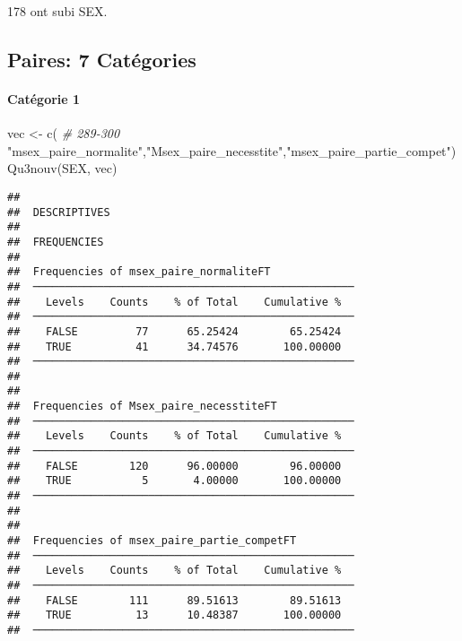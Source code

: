 \documentclass[
]{article}
\newenvironment{Shaded}{\begin{snugshade}}{\end{snugshade}}
\newcommand{\CommentTok}[1]{\textcolor[rgb]{0.56,0.35,0.01}{\textit{#1}}}
\newcommand{\DecValTok}[1]{\textcolor[rgb]{0.00,0.00,0.81}{#1}}
\newcommand{\FunctionTok}[1]{\textcolor[rgb]{0.00,0.00,0.00}{#1}}
\newcommand{\NormalTok}[1]{#1}
\newcommand{\OtherTok}[1]{\textcolor[rgb]{0.56,0.35,0.01}{#1}}
\newcommand{\SpecialCharTok}[1]{\textcolor[rgb]{0.00,0.00,0.00}{#1}}
\newcommand{\StringTok}[1]{\textcolor[rgb]{0.31,0.60,0.02}{#1}}
\begin{document}
\begin{Shaded}
\end{Shaded}

178 ont subi SEX.

\hypertarget{paires-7-catuxe9gories}{%
\subsection{Paires: 7 Catégories}\label{paires-7-catuxe9gories}}

\hypertarget{catuxe9gorie-1-2}{%
\paragraph{Catégorie 1}\label{catuxe9gorie-1-2}}

\begin{Shaded}
\begin{Highlighting}[]
\NormalTok{vec }\OtherTok{\textless{}{-}} \FunctionTok{c}\NormalTok{(   }\CommentTok{\# 289{-}300}
  \StringTok{"msex\_paire\_normalite"}\NormalTok{,}\StringTok{"Msex\_paire\_necesstite"}\NormalTok{,}\StringTok{"msex\_paire\_partie\_compet"}\NormalTok{)}
\FunctionTok{Qu3nouv}\NormalTok{(SEX, vec)}
\end{Highlighting}
\end{Shaded}

\begin{verbatim}
## 
##  DESCRIPTIVES
## 
##  FREQUENCIES
## 
##  Frequencies of msex_paire_normaliteFT              
##  ────────────────────────────────────────────────── 
##    Levels    Counts    % of Total    Cumulative %   
##  ────────────────────────────────────────────────── 
##    FALSE         77      65.25424        65.25424   
##    TRUE          41      34.74576       100.00000   
##  ────────────────────────────────────────────────── 
## 
## 
##  Frequencies of Msex_paire_necesstiteFT             
##  ────────────────────────────────────────────────── 
##    Levels    Counts    % of Total    Cumulative %   
##  ────────────────────────────────────────────────── 
##    FALSE        120      96.00000        96.00000   
##    TRUE           5       4.00000       100.00000   
##  ────────────────────────────────────────────────── 
## 
## 
##  Frequencies of msex_paire_partie_competFT          
##  ────────────────────────────────────────────────── 
##    Levels    Counts    % of Total    Cumulative %   
##  ────────────────────────────────────────────────── 
##    FALSE        111      89.51613        89.51613   
##    TRUE          13      10.48387       100.00000   
##  ──────────────────────────────────────────────────
\end{verbatim}
\end{document}
